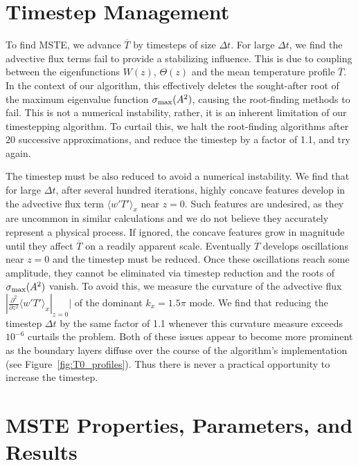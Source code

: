 \documentclass[reprint,amsmath,amssymb,aps,nofootinbib]{revtex4-1}
\newcommand{\eq}[1]{(\ref{#1})}
\begin{document}
\section{Timestep Management} \label{sec:timestep}
To find MSTE, we advance $\overline{T}$ by timesteps of size $\Delta t$.
For large $\Delta t$, we find the advective flux terms fail to provide a stabilizing influence.
This is due to coupling between the eigenfunctions $W(z)$, $\Theta(z)$ and the mean temperature profile $\overline{T}$.
In the context of our algorithm, this effectively deletes the sought-after root of the maximum eigenvalue function $\sigma_{\rm{max}}(A^2)$, causing the root-finding methods to fail. 
This is not a numerical instability, rather, it is an inherent limitation of our timestepping algorithm.
To curtail this, we halt the root-finding algorithms after 20 successive approximations, and reduce the timestep by a factor of 1.1, and try again.

The timestep must be also reduced to avoid a numerical instability.
We find that for large $\Delta t$, after several hundred iterations, highly concave features develop in the advective flux term $\langle w'T' \rangle_x$ near $z=0$. 
Such features are undesired, as they are uncommon in similar calculations \cite{Malkus_1954} and we do not believe they accurately represent a physical process.
If ignored, the concave features grow in magnitude until they affect $\overline{T}$ on a readily apparent scale.
Eventually $\overline{T}$ develops oscillations near $z = 0$ and the timestep must be reduced.
Once these oscillations reach some amplitude, they cannot be eliminated via timestep reduction and the roots of $\sigma_{\rm{max}}(A^2)$ vanish.
To avoid this, we measure the curvature of the advective flux $|\frac{\partial^2}{\partial z^2} \langle w'T' \rangle_x|_{z=0}|$ of the dominant $k_x = 1.5\pi$ mode.
We find that reducing the timestep $\Delta t$ by the same factor of 1.1 whenever this curvature measure exceeds $10^{-6}$ curtails the problem.
Both of these issues appear to become more prominent as the boundary layers diffuse over the course of the algorithm's implementation (see Figure~\ref{fig:T0_profiles}).
Thus there is never a practical opportunity to increase the timestep.

\onecolumngrid
\section{MSTE Properties, Parameters, and Results}\label{sec:tables}
\end{document}
